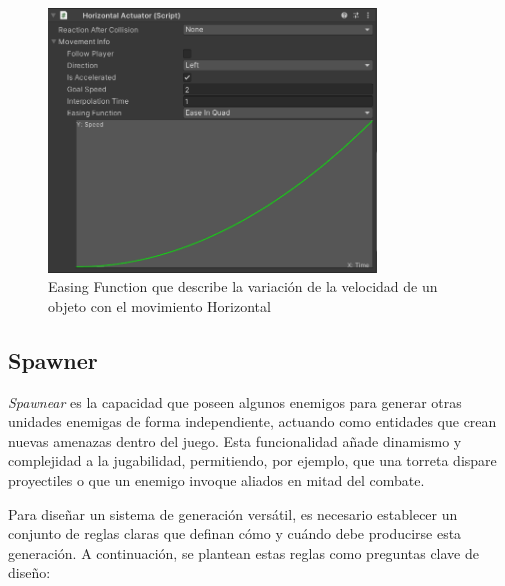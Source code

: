 \begin{figure}[t]
	\centering
	\includegraphics[height=7cm]{Imagenes/HorizontalMovementAccelerated.png}
	\caption{Easing Function que describe la variación de la velocidad de un objeto con el movimiento Horizontal}
	\label{fig:EasingFuntionVel}
\end{figure}

\subsection{Spawner}
\label{subsec:spawner}

\textit{Spawnear} es la capacidad que poseen algunos enemigos para generar otras unidades enemigas de forma independiente, actuando como entidades que crean nuevas amenazas dentro del juego. Esta funcionalidad añade dinamismo y complejidad a la jugabilidad, permitiendo, por ejemplo, que una torreta dispare proyectiles o que un enemigo invoque aliados en mitad del combate.

Para diseñar un sistema de generación versátil, es necesario establecer un conjunto de reglas claras que definan cómo y cuándo debe producirse esta generación. A continuación, se plantean estas reglas como preguntas clave de diseño:

